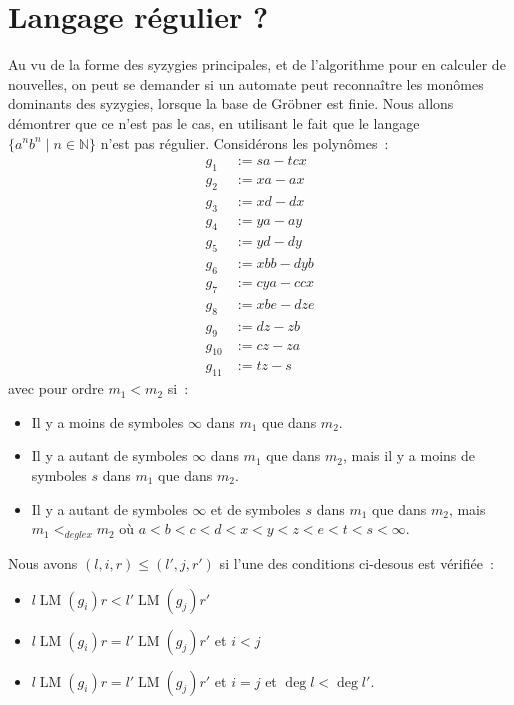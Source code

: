 \documentclass{article}
\newcommand{\N}{\mathbb{N}}
\DeclareMathOperator{\LM}{LM}
\begin{document}
\section*{Langage régulier ?}
Au vu de la forme des syzygies principales, et de l'algorithme pour en calculer de nouvelles, on peut se demander si un automate peut reconnaître les monômes dominants des syzygies, lorsque la base de Gröbner est finie.
Nous allons démontrer que ce n'est pas le cas, en utilisant le fait que le langage $\{a^nb^n \;|\; n \in \N\}$ n'est pas régulier.
Considérons les polynômes~:
\begin{align*}
g_1 & := sa - tcx \\
g_2 & := xa - ax \\
g_3 & := xd - dx \\
g_4 & := ya - ay \\
g_5 & := yd - dy \\
g_6 & := xbb - dyb \\
g_7 & := cya - ccx \\
g_8 & := xbe - dze \\
g_9 & := dz - zb \\
g_{10} & := cz - za \\
g_{11} & := tz - s
\end{align*}
avec pour ordre $m_1 < m_2$ si~:
\begin{itemize}
\item Il y a moins de symboles $\infty$ dans $m_1$ que dans $m_2$.
\item Il y a autant de symboles $\infty$ dans $m_1$ que dans $m_2$, mais il y a moins de symboles $s$ dans $m_1$ que dans $m_2$.
\item Il y a autant de symboles $\infty$ et de symboles $s$ dans $m_1$ que dans $m_2$, mais
$m_1 <_{deglex} m_2$ où $a < b < c < d < x < y < z < e < t < s < \infty$.
\end{itemize}

Nous avons $(l, i, r) \leq (l', j, r')$ si l'une des conditions ci-desous est vérifiée~:
\begin{itemize}
	\item $l\LM(g_i)r < l'\LM(g_j)r'$
	\item $l\LM(g_i)r = l'\LM(g_j)r'$ et $i < j$
	\item $l\LM(g_i)r = l'\LM(g_j)r'$ et $i = j$ et $\deg{l} < \deg{l'}$.
\end{itemize}
\end{document}

